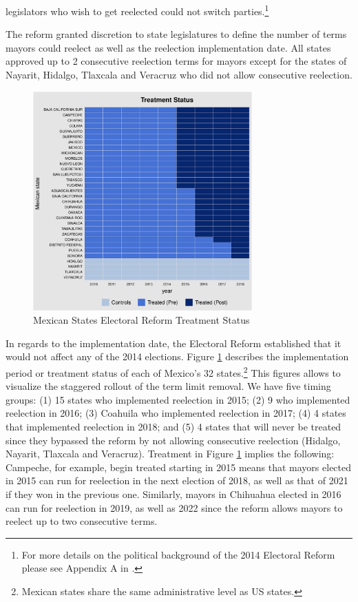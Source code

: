 \documentclass[12pt]{amsart}
\numberwithin{equation}{section}
\theoremstyle{definition}
\theoremstyle{definition}
\theoremstyle{definition}
\begin{document}
legislators who wish to get reelected could not switch parties.\footnote{For more details on the political background of the 2014 Electoral Reform please see Appendix A in \citet{ch_2021}.}

The reform granted discretion to state legislatures to define the number of terms mayors could reelect as well as the reelection implementation date. All states approved up to 2 consecutive reelection terms for mayors except for the states of Nayarit, Hidalgo, Tlaxcala and Veracruz who did not allow consecutive reelection. 

\begin{figure}[H]   
\centering 
\caption{Mexican States Electoral Reform Treatment Status}
\label{fig:treatment_status}
\includegraphics[width=0.75\textwidth]{Figures_incumbency/reform_treatmentstatus.pdf}     
\captionsetup{justification=centering} 
\end{figure}     
  
  
In regards to the implementation date, the Electoral Reform established that it would not affect any of the 2014 elections. Figure \ref{fig:treatment_status} describes the implementation period or treatment status of each of Mexico's 32 states.\footnote{Mexican states share the same administrative level as US states.} This figures allows to visualize the staggered rollout of the term limit removal. We have five timing groups: (1) 15 states who implemented reelection in 2015; (2) 9 who implemented reelection in 2016; (3) Coahuila who implemented reelection in 2017; (4) 4 states that implemented reelection in 2018; and (5) 4 states that will never be treated since they bypassed the reform by not allowing consecutive reelection (Hidalgo, Nayarit, Tlaxcala and Veracruz). Treatment in Figure \ref{fig:treatment_status} implies the following: Campeche, for example, begin treated starting in 2015 means that mayors elected in 2015 can run for reelection in the next election of 2018, as well as that of 2021 if they won in the previous one. Similarly, mayors in Chihuahua elected in 2016 can run for reelection in 2019, as well as 2022 since the reform allows mayors to reelect up to two consecutive terms. 
\end{document}
